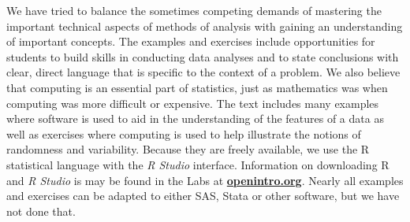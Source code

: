 \begin{doublespace}
We have tried to balance the sometimes competing demands of mastering the important technical aspects of methods of analysis with gaining an understanding of important concepts.  The examples and exercises include opportunities for students to build skills in conducting data analyses and to state conclusions with clear, direct language that is specific to the context of a problem.  We also believe that computing is an essential part of statistics, just as mathematics was when computing was more difficult or expensive.  The text includes many examples where software is used to aid in the understanding of the features of a data as well as exercises where computing is used to help illustrate the notions of randomness and variability. Because they are freely available, we use the \textsf{R} statistical language with the \textsl{R Studio} interface.  Information on downloading \textsf{R} and \textsl{R Studio} is may be found in the Labs at \href{http://www.openintro.org}{\color{black}\textbf{openintro.org}}.  Nearly all examples and exercises can be adapted to either SAS, Stata or other software, but we have not done that.



\begin{comment}

This book may be downloaded as a free PDF at \href{http://www.openintro.org}{\color{black}\textbf{openintro.org}}. %
\vspace{3mm}

\noindent We hope readers will take away three ideas from this book in addition to forming a foundation of statistical thinking and methods.\vspace{-1mm}
\begin{enumerate}
\setlength{\itemsep}{0mm}
\item[(1)] Statistics is an applied field with a wide range of practical applications.
\item[(2)] You don't have to be a math guru to learn from real, interesting data.
\item[(3)] Data is messy, and statistical tools are imperfect. But, when you understand the strengths and weaknesses of these tools, you can use them to learn about the real~world.
\end{enumerate}

\end{comment}


\end{doublespace}
